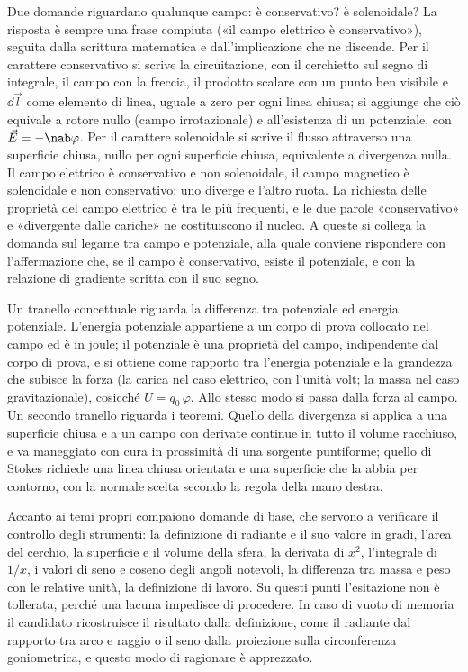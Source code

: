 \documentclass[main.tex]{subfiles}
\begin{document}
Due domande riguardano qualunque campo: è conservativo? è solenoidale? La risposta è sempre una frase compiuta («il campo elettrico è conservativo»), seguita dalla scrittura matematica e dall'implicazione che ne discende. Per il carattere conservativo si scrive la circuitazione, con il cerchietto sul segno di integrale, il campo con la freccia, il prodotto scalare con un punto ben visibile e $\dd\vec l$ come elemento di linea, uguale a zero per ogni linea chiusa; si aggiunge che ciò equivale a rotore nullo (campo irrotazionale) e all'esistenza di un potenziale, con $\vec E=-\nab\varphi$. Per il carattere solenoidale si scrive il flusso attraverso una superficie chiusa, nullo per ogni superficie chiusa, equivalente a divergenza nulla. Il campo elettrico è conservativo e non solenoidale, il campo magnetico è solenoidale e non conservativo: uno diverge e l'altro ruota. La richiesta delle proprietà del campo elettrico è tra le più frequenti, e le due parole «conservativo» e «divergente dalle cariche» ne costituiscono il nucleo. A queste si collega la domanda sul legame tra campo e potenziale, alla quale conviene rispondere con l'affermazione che, se il campo è conservativo, esiste il potenziale, e con la relazione di gradiente scritta con il suo segno.

Un tranello concettuale riguarda la differenza tra potenziale ed energia potenziale. L'energia potenziale appartiene a un corpo di prova collocato nel campo ed è in joule; il potenziale è una proprietà del campo, indipendente dal corpo di prova, e si ottiene come rapporto tra l'energia potenziale e la grandezza che subisce la forza (la carica nel caso elettrico, con l'unità volt; la massa nel caso gravitazionale), cosicché $U=q_0\,\varphi$. Allo stesso modo si passa dalla forza al campo. Un secondo tranello riguarda i teoremi. Quello della divergenza si applica a una superficie chiusa e a un campo con derivate continue in tutto il volume racchiuso, e va maneggiato con cura in prossimità di una sorgente puntiforme; quello di Stokes richiede una linea chiusa orientata e una superficie che la abbia per contorno, con la normale scelta secondo la regola della mano destra.

Accanto ai temi propri compaiono domande di base, che servono a verificare il controllo degli strumenti: la definizione di radiante e il suo valore in gradi, l'area del cerchio, la superficie e il volume della sfera, la derivata di $x^2$, l'integrale di $1/x$, i valori di seno e coseno degli angoli notevoli, la differenza tra massa e peso con le relative unità, la definizione di lavoro. Su questi punti l'esitazione non è tollerata, perché una lacuna impedisce di procedere. In caso di vuoto di memoria il candidato ricostruisce il risultato dalla definizione, come il radiante dal rapporto tra arco e raggio o il seno dalla proiezione sulla circonferenza goniometrica, e questo modo di ragionare è apprezzato.
\end{document}
